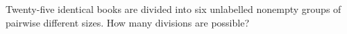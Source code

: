 Twenty-five identical books are divided into six unlabelled nonempty groups of pairwise different sizes. How many divisions are possible?
